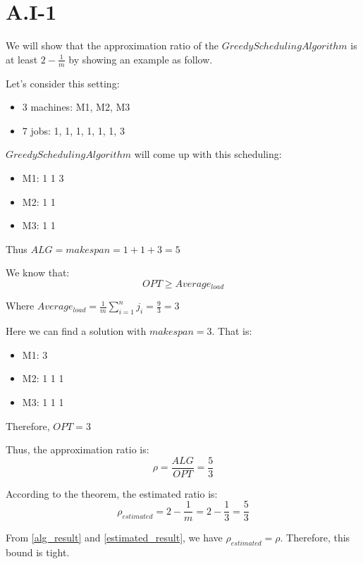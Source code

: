 \section*{A.I-1}
\label{a-1-1)}

We will show that the approximation ratio of the $GreedySchedulingAlgorithm$ is at least $2 - \frac{1}{m}$ by showing an example as follow.

Let's consider this setting:

\begin{itemize}
    \item 3 machines: M1, M2, M3
    \item 7 jobs: 1, 1, 1, 1, 1, 1, 3
  \end{itemize}

$Greedy Scheduling Algorithm$ will come up with this scheduling:

\begin{itemize}
\item M1: 1 1 3
\item M2: 1 1
\item M3: 1 1
\end{itemize}

Thus $ALG = makespan = 1 + 1 + 3 = 5$

We know that:
\begin{equation}
 OPT \geq Average_{load} 
\end{equation}

Where $Average_{load} = \frac{1}{m} \sum_{i=1}^{n} j_i = \frac{9}{3} = 3$

Here we can find a solution with $makespan = 3$. That is:
\begin{itemize}
\item M1: 3
\item M2: 1 1 1
\item M3: 1 1 1
\end{itemize}

Therefore, $OPT = 3$

Thus, the approximation ratio is:
\begin{equation}
  \label{alg_result}
  \rho = \frac{ALG}{OPT} = \frac{5}{3} 
\end{equation}

According to the theorem, the estimated ratio is:
\begin{equation}
  \label{estimated_result}
  \rho_{estimated} = 2 - \frac{1}{m} = 2 - \frac{1}{3} = \frac{5}{3}
\end{equation}

From \ref{alg_result} and \ref{estimated_result}, we have $\rho_{estimated} = \rho$. Therefore, this bound is tight.
